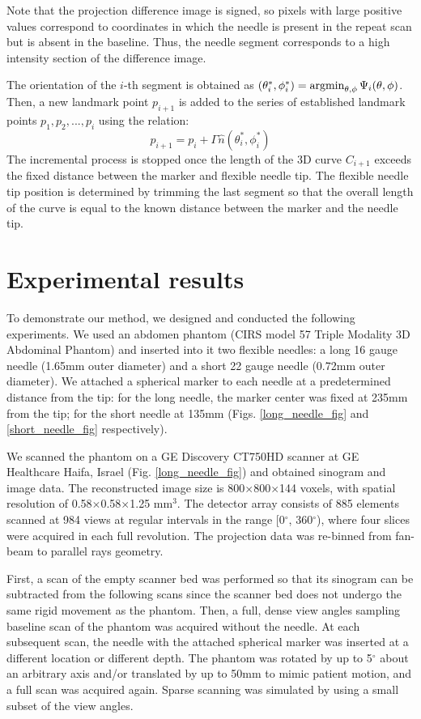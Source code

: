 Note that the projection difference image is signed, so pixels with large positive values correspond to coordinates in which the needle is present in the repeat scan but is absent in the baseline. Thus, the needle segment corresponds to a high intensity section of the difference image.

The orientation of the $i$-th segment is obtained as $(\theta_i^*, \phi_i^*) = \operatorname*{argmin}_{\theta, \phi} {\Psi_i ( \theta, \phi)}$. Then, a new landmark point $p_{i+1}$ is added to the series of established landmark points $p_1, p_2, ..., p_i$ using the relation:
\begin{equation}
p_{i+1} = p_i + \Gamma \hat{n}(\theta_i^*, \phi_i^*)
\end{equation}
The incremental process is stopped once the length of the 3D curve $C_{i+1}$ exceeds the fixed distance between the marker and flexible needle tip. The flexible needle tip position is determined by trimming the last segment so that the overall length of the curve is equal to the known distance between the marker and the needle tip.

\section*{Experimental results}

To demonstrate our method, we designed and conducted the following experiments. We used an abdomen phantom (CIRS model 57 Triple Modality 3D Abdominal Phantom) and inserted into it two flexible needles: a long 16 gauge needle (1.65mm outer diameter) and a short 22 gauge needle (0.72mm outer diameter). We attached a spherical marker to each needle at a predetermined distance from the tip: for the long needle, the marker center was fixed at 235mm from the tip; for the short needle at 135mm (Figs.  \ref{long_needle_fig} and \ref{short_needle_fig} respectively).

We scanned the phantom on a GE Discovery CT750HD scanner at GE Healthcare Haifa, Israel (Fig. \ref{long_needle_fig}) and obtained sinogram and image data. The reconstructed image size is 800$\times$800$\times$144 voxels, with spatial resolution of 0.58$\times$0.58$\times$1.25 mm$^3$. The detector array consists of 885 elements scanned at 984 views at regular intervals in the range [0$^{\circ}$, 360$^{\circ}$), where four slices were acquired in each full revolution. The projection data was re-binned from fan-beam to parallel rays geometry.

First, a scan of the empty scanner bed was performed so that its sinogram can be subtracted from the following scans since the scanner bed does not undergo the same rigid movement as the phantom. Then, a full, dense view angles sampling baseline scan of the phantom was acquired without the needle. At each subsequent scan, the needle with the attached spherical marker was inserted at a different location or different depth. The phantom was rotated by up to 5$^\circ$ about an arbitrary axis and/or translated by up to 50mm to mimic patient motion, and a full scan was acquired again. Sparse scanning was simulated by using a small subset of the view angles.


